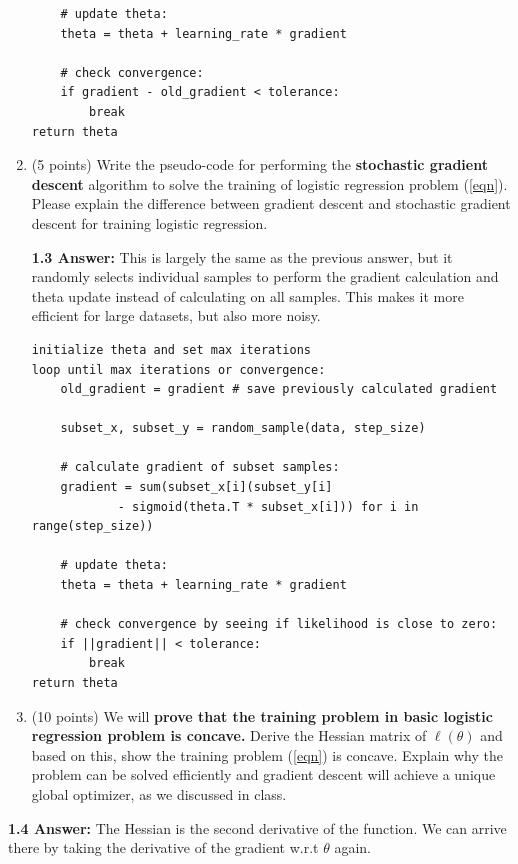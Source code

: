 \documentclass[12pt]{article}
\begin{document}
\begin{enumerate}
\begin{lstlisting}
    # update theta:
    theta = theta + learning_rate * gradient

    # check convergence:
    if gradient - old_gradient < tolerance:
        break
return theta
\end{lstlisting}

\item (5 points) Write the pseudo-code for performing the {\bf stochastic gradient descent} algorithm to solve the training of logistic regression problem (\ref{eqn}). Please explain the difference between gradient descent and stochastic gradient descent for training logistic regression.

{\bf 1.3 Answer:} This is largely the same as the previous answer, but it randomly selects individual samples to perform the gradient calculation and theta update instead of calculating on all samples. This makes it more efficient for large datasets, but also more noisy.

\begin{lstlisting}
initialize theta and set max iterations
loop until max iterations or convergence:
    old_gradient = gradient # save previously calculated gradient
    
    subset_x, subset_y = random_sample(data, step_size)

    # calculate gradient of subset samples:
    gradient = sum(subset_x[i](subset_y[i] 
            - sigmoid(theta.T * subset_x[i])) for i in range(step_size))

    # update theta:
    theta = theta + learning_rate * gradient

    # check convergence by seeing if likelihood is close to zero:
    if ||gradient|| < tolerance:
        break
return theta
\end{lstlisting}

\item (10 points) We will {\bf prove that the training problem in basic logistic regression problem is concave.} Derive the Hessian matrix of $\ell(\theta)$ and based on this, show the training problem (\ref{eqn}) is concave. Explain why the problem can be solved efficiently and gradient descent will achieve a unique global optimizer, as we discussed in class. 
\end{enumerate}

{\bf 1.4 Answer:} The Hessian is the second derivative of the function. We can arrive there by taking the derivative of the gradient w.r.t $\theta$ again.
\end{document}
